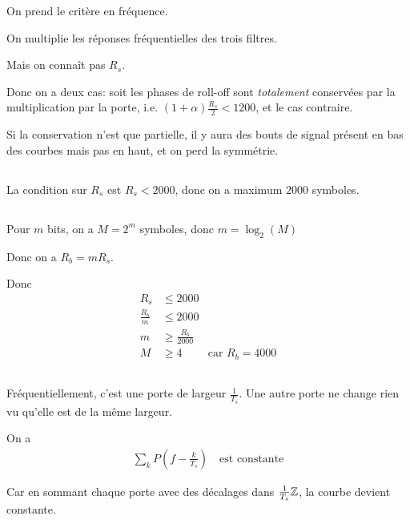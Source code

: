 \documentclass{article}
\begin{document}
On prend le critère en fréquence.

On multiplie les réponses fréquentielles des trois filtres.

Mais on connaît pas $R_s$.

Donc on a deux cas: soit les phases de roll-off sont \emph{totalement} conservées par la multiplication par la porte, i.e. $(1+\alpha) \frac{R_s}{2} < 1200$, et le cas contraire.

Si la conservation n'est que partielle, il y aura des bouts de signal présent en bas des courbes mais pas en haut, et on perd la symmétrie.

\subsection{}

La condition sur $R_s$ est $R_s < 2000$, donc on a maximum  $2000$ symboles.


\subsection{}

Pour $m$ bits, on a $M = 2^{m}$ symboles, donc $m = \log_2(M)$

Donc on a $R_b = m R_s$.

Donc  \begin{align*}
    R_s &\le 2000 \\
    \frac{R_b}{m} &\le  2000 \\
    m &\ge  \frac{R_b}{2000} \\
    M &\ge 4 \quad&\text{car $R_b = 4000$}
\end{align*}

\subsection{}
\subsubsection{}
Fréquentiellement, c'est une porte de largeur $\frac{1}{T_s}$. Une autre porte ne change rien vu qu'elle est de la même largeur.

On a \begin{align*}
    \sum_{k} P(f- \frac{k}{T_s}) \quad\text{est constante}
\end{align*}

Car en sommant chaque porte avec des décalages dans $\frac{1}{T_s} \mathbb{Z}$, la courbe devient constante.
\end{document}
